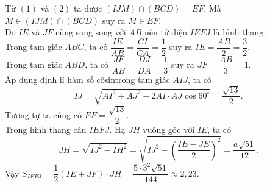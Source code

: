 \begin{ex}
{		Từ $(1)$ và $(2)$ ta được $(IJM) \cap (BCD) = EF$. Mà $M \in (IJM) \cap (BCD)$ suy ra  $M \in EF$.\\
		Do $IE$  và $JF$ cùng song song với $AB$ nên tứ diện $IEFJ$ là hình thang. \\
		Trong tam giác $ABC$, ta có $\dfrac{IE}{AB}=\dfrac{CI}{CA}=\dfrac{1}{2}$ suy ra  $IE=\dfrac{AB}{2}=\dfrac{3}{2}$.\\
		Trong tam  giác $ABD$, ta có $\dfrac{JF}{AB}=\dfrac{DJ}{DA}=\dfrac{1}{3}$ suy ra $JF=\dfrac{AB}{3}=1$. \\
		Áp dụng định lí hàm số côsintrong tam giác  $AIJ$, ta có
		 \[IJ=\sqrt{AI^2+AJ^2-2AI\cdot AJ\cos 60^{\circ}}=\dfrac{\sqrt{13}}{2}.\]
		Tương tự ta cũng có $EF=\dfrac{\sqrt{13}}{2}$. \\ 
		Trong hình  thang cân $IEFJ$. Hạ $JH$ vuông góc với $IE$, ta có \\
		\[JH=\sqrt{IJ^2-IH^2}=\sqrt{IJ^2-{\left(\dfrac{IE-JE}{2}\right)}^2}=\dfrac{a\sqrt{51}}{12}.\] 
		Vậy $S_{IEFJ}=\dfrac{1}{2}(IE+JF)\cdot JH=\dfrac{5\cdot  3^2\sqrt{51}}{144} \approx 2{,}23$.
	 }
\end{ex}


